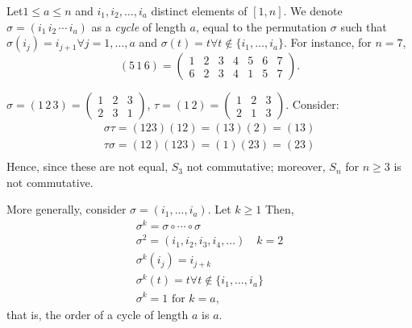 \documentclass[12pt,oneside]{article}
\begin{document}
\begin{definition}[Cycles]
  Let\footnotemark $1 \leq a \leq n$ and $i_1, i_2, \dots, i_a$ distinct elements of $[1, n]$. We denote $\sigma = (i_1\, i_2\,\cdots \,i_a)$ as a \emph{cycle} of length $a$, equal to the permutation $\sigma$ such that $\sigma (i_j) = i_{j+1} \forall j = 1, \dots, a$ and $\sigma(t) = t \forall t \notin \{i_1, \dots, i_a\}$. For instance, for $n=7$, \[
  (5\, 1\,6) = \begin{pmatrix}
    1 & 2 & 3 & 4 & 5 & 6 & 7\\
    6 & 2 & 3 &4 & 1 & 5 & 7
  \end{pmatrix}.  
  \]
\end{definition}
\begin{example}[$n=3$]
  $\sigma = (1 \,2 \,3) = \begin{pmatrix}
    1 & 2 & 3\\
    2 & 3 & 1
  \end{pmatrix}$, $\tau = (1\, 2) = \begin{pmatrix}
    1 & 2 & 3\\
    2 & 1 & 3
  \end{pmatrix}$. Consider:
  \begin{align*}
  \sigma \tau = (1 2 3)(1 2) = (1 3)(2) = (1 3)  \\
\tau \sigma = (1 2)(1 2 3) = (1)(2 3) = (2 3)\\
  \end{align*}
Hence, since these are not equal, $S_3$ not commutative; moreover, $S_n$ for $n \geq 3$ is not commutative.

More generally, consider $\sigma = (i_1, \dots, i_a).$ Let $k \geq 1$ Then, \begin{align*}
  \sigma^k = \sigma \circ \cdots \circ \sigma\\
  \sigma^2 = (i_1, i_2, i_3, i_4, \dots) \quad k = 2\\
  \sigma^k(i_j) = i_{j+k}\\
  \sigma^{k}(t) = t \forall t \notin \{i_1, \dots, i_a \}\\
  \sigma^k = 1 \text{ for } k = a,
\end{align*}
that is, the order of a cycle of length $a$ is $a$.
\end{example}
\end{document}
